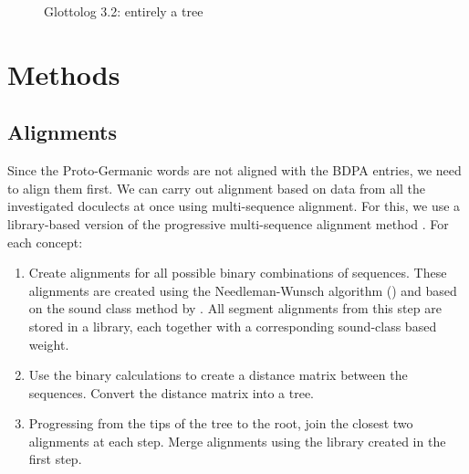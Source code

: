 \documentclass{article}
\begin{document}
\begin{figure}
\centering
{}
\caption{Glottolog 3.2: entirely a tree}
\label{fig:cwg_glottolog}
\end{figure}


\section{Methods}

\subsection{Alignments}
\label{s:alignments}

Since the Proto-Germanic words are not aligned with the BDPA entries, we need to align them first. 
We can carry out alignment based on data from all the investigated doculects at once using multi-sequence alignment.
For this, we use a library-based version \cite{notredame2000t-coffee:} of the progressive multi-sequence alignment method \cite{thompson1994clustal}.
For each concept:


\begin{enumerate}
\item
Create alignments for all possible binary combinations of sequences.
These alignments are created using the Needleman-Wunsch algorithm (\cite{needleman1970general}) and based on the sound class method by \cite{list2012sca:}.
All segment alignments from this step are stored in a library, each together with a corresponding sound-class based weight. %

\item
Use the binary calculations to create a distance matrix between the sequences.
Convert the distance matrix into a tree.

\item 
Progressing from the tips of the tree to the root, join the closest two alignments at each step.
Merge alignments using the library created in the first step.
\end{enumerate}
\end{document}
